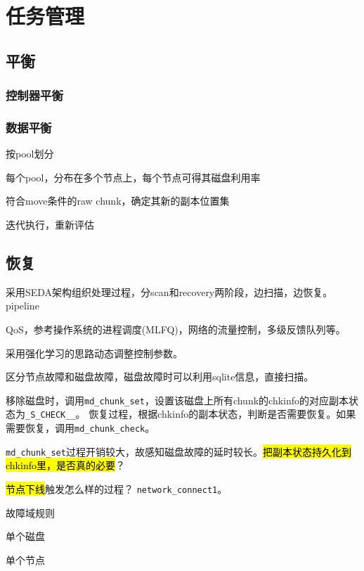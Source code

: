 \chapter{任务管理}

\section{平衡}

\subsection{控制器平衡}

\subsection{数据平衡}

\begin{enumbox}
\item 按pool划分
\item 每个pool，分布在多个节点上，每个节点可得其磁盘利用率
\item 符合move条件的raw chunk，确定其新的副本位置集
\item 迭代执行，重新评估
\end{enumbox}

\section{恢复}

采用SEDA架构组织处理过程，分scan和recovery两阶段，边扫描，边恢复。
pipeline

QoS，参考操作系统的进程调度(MLFQ)，网络的流量控制，多级反馈队列等。

采用强化学习的思路动态调整控制参数。

区分节点故障和磁盘故障，磁盘故障时可以利用sqlite信息，直接扫描。

移除磁盘时，调用\verb|md_chunk_set|，设置该磁盘上所有chunk的chkinfo的对应副本状态为\verb|_S_CHECK__|。
恢复过程，根据chkinfo的副本状态，判断是否需要恢复。如果需要恢复，调用\verb|md_chunk_check|。

\verb|md_chunk_set|过程开销较大，故感知磁盘故障的延时较长。\hl{把副本状态持久化到chkinfo里，是否真的必要}？

\hl{节点下线}触发怎么样的过程？ \verb|network_connect1|。

故障域规则

单个磁盘

单个节点

